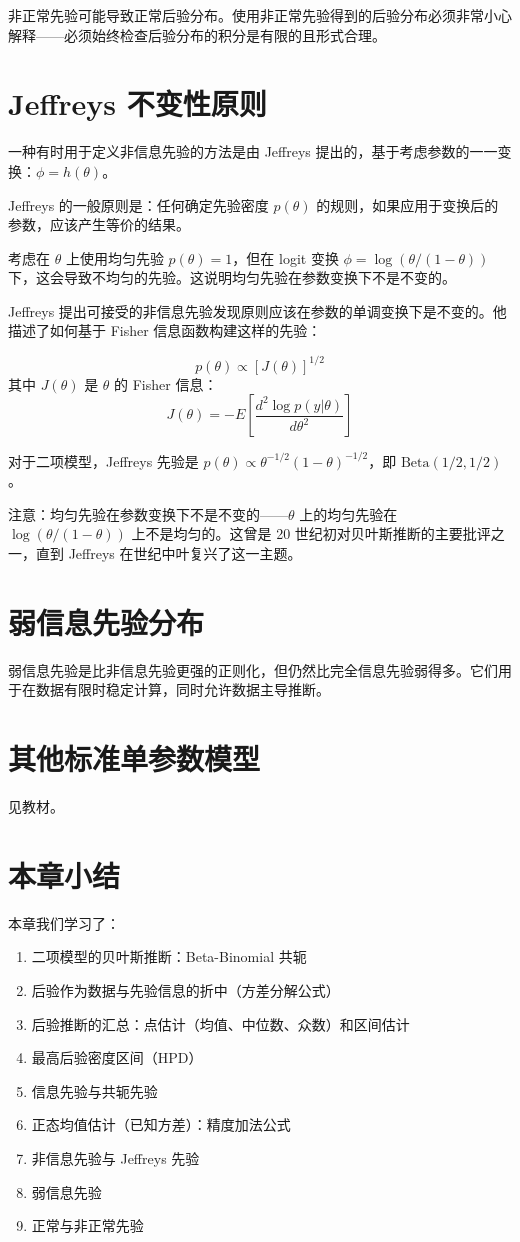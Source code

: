 非正常先验可能导致正常后验分布。使用非正常先验得到的后验分布必须非常小心解释——必须始终检查后验分布的积分是有限的且形式合理。

\section{Jeffreys 不变性原则}

一种有时用于定义非信息先验的方法是由 Jeffreys 提出的，基于考虑参数的一一变换：$\phi = h(\theta)$。

Jeffreys 的一般原则是：任何确定先验密度 $p(\theta)$ 的规则，如果应用于变换后的参数，应该产生等价的结果。

考虑在 $\theta$ 上使用均匀先验 $p(\theta) = 1$，但在 logit 变换 $\phi = \log(\theta/(1-\theta))$ 下，这会导致不均匀的先验。这说明均匀先验在参数变换下不是不变的。

Jeffreys 提出可接受的非信息先验发现原则应该在参数的单调变换下是不变的。他描述了如何基于 Fisher 信息函数构建这样的先验：

\[
p(\theta) \propto [J(\theta)]^{1/2}
\]
其中 $J(\theta)$ 是 $\theta$ 的 Fisher 信息：
\[
J(\theta) = -E\left[\frac{d^2 \log p(y|\theta)}{d\theta^2}\right]
\]

对于二项模型，Jeffreys 先验是 $p(\theta) \propto \theta^{-1/2}(1-\theta)^{-1/2}$，即 $\text{Beta}(1/2, 1/2)$。

注意：均匀先验在参数变换下不是不变的——$\theta$ 上的均匀先验在 $\log(\theta/(1-\theta))$ 上不是均匀的。这曾是 20 世纪初对贝叶斯推断的主要批评之一，直到 Jeffreys 在世纪中叶复兴了这一主题。

\section{弱信息先验分布}

弱信息先验是比非信息先验更强的正则化，但仍然比完全信息先验弱得多。它们用于在数据有限时稳定计算，同时允许数据主导推断。

\section{其他标准单参数模型}

见教材。

\section{本章小结}

本章我们学习了：
\begin{enumerate}
  \item 二项模型的贝叶斯推断：Beta-Binomial 共轭
  \item 后验作为数据与先验信息的折中（方差分解公式）
  \item 后验推断的汇总：点估计（均值、中位数、众数）和区间估计
  \item 最高后验密度区间（HPD）
  \item 信息先验与共轭先验
  \item 正态均值估计（已知方差）：精度加法公式
  \item 非信息先验与 Jeffreys 先验
  \item 弱信息先验
  \item 正常与非正常先验
\end{enumerate}

